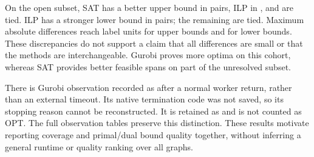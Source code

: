 On the open subset, SAT has a better upper bound in
\ProgressOpenSATUB{} pairs, ILP in \ProgressOpenILPUB{}, and
\ProgressOpenEqualUB{} are tied. ILP has a stronger lower bound in
\ProgressOpenILPLB{} pairs; the remaining \ProgressOpenEqualLB{} are tied.
Maximum absolute differences reach \ProgressMaxUB{} label units for upper
bounds and \ProgressMaxLB{} for lower bounds. These discrepancies do not
support a claim that all differences are small or that the methods are
interchangeable. Gurobi proves more optima on this cohort, whereas SAT
provides better feasible spans on part of the unresolved subset.

There is \ProgressReturnedFeasible{} Gurobi observation recorded as
\FEAS{} after a normal worker return, rather than an external timeout.
Its native termination code was not saved, so its stopping reason cannot
be reconstructed. It is retained as \FEAS{} and is not counted as OPT.
The full observation tables preserve this distinction. These results
motivate reporting coverage and primal/dual bound quality together,
without inferring a general runtime or quality ranking over all graphs.



\FloatBarrier

